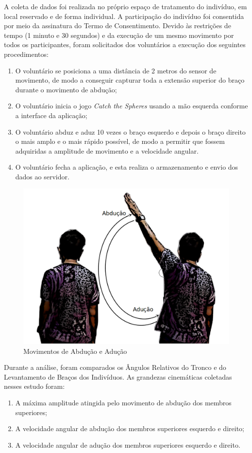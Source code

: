 A coleta de dados foi realizada no próprio espaço de tratamento do indivíduo, em local reservado e de forma individual. A participação do indivíduo foi consentida por meio da assinatura do Termo de Consentimento. Devido às restrições de tempo (1 minuto e 30 segundos) e da execução de um mesmo movimento por todos os participantes, foram solicitados dos voluntários a execução dos seguintes procedimentos:
\begin{enumerate}
	\item O voluntário se posiciona a uma distância de 2 metros do sensor de movimento, de modo a conseguir capturar toda a extensão superior do braço durante o movimento de abdução; 	
	\item O voluntário inicia o jogo \textit{Catch the Spheres} usando a mão esquerda conforme a interface da aplicação;
	\item O voluntário abduz e aduz 10 vezes o braço esquerdo e depois o braço direito o mais amplo e o mais rápido possível, de modo a permitir que fossem adquiridas a amplitude de movimento e a velocidade angular. 
	\item O voluntário fecha a aplicação, e esta realiza o armazenamento e envio dos dados ao servidor.
\end{enumerate}

\begin{figure}[!htbp]
 \centering
 \includegraphics[scale=0.25]{./img/movaddcutctionartist2.png}
\caption{Movimentos de Abdução e Adução}
 \label{fig:movabducaomet}
\end{figure}

Durante a análise, foram comparados os Ângulos Relativos do Tronco e do Levantamento de Braços dos Indivíduos. As grandezas cinemáticas coletadas nesses estudo foram:
\begin{enumerate}
	\item A máxima amplitude atingida pelo movimento de abdução dos membros superiores;
	\item A velocidade angular de abdução dos membros superiores esquerdo e direito;
	\item A velocidade angular de adução dos membros superiores esquerdo e direito.
\end{enumerate}

